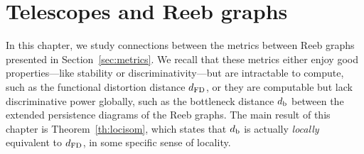 \chapter{Telescopes and Reeb graphs}
\label{chap:backgroundTelescopesReeb}

%
%
In this chapter, we study connections between the metrics between Reeb graphs presented in Section~\ref{sec:metrics}.
We recall that these metrics either enjoy good properties---like stability
or discriminativity---but are intractable to compute, such as the functional distortion distance $d_{\rm FD}$, 
or they are computable but lack discriminative power globally, 
such as the bottleneck distance $d_{\rm b}$ between the extended persistence diagrams of the Reeb graphs.
The main result of this chapter is Theorem~\ref{th:locisom}, which states that $d_{\rm b}$ is actually 
{\em locally} equivalent to $d_{\rm FD}$, in some specific sense of locality. 

